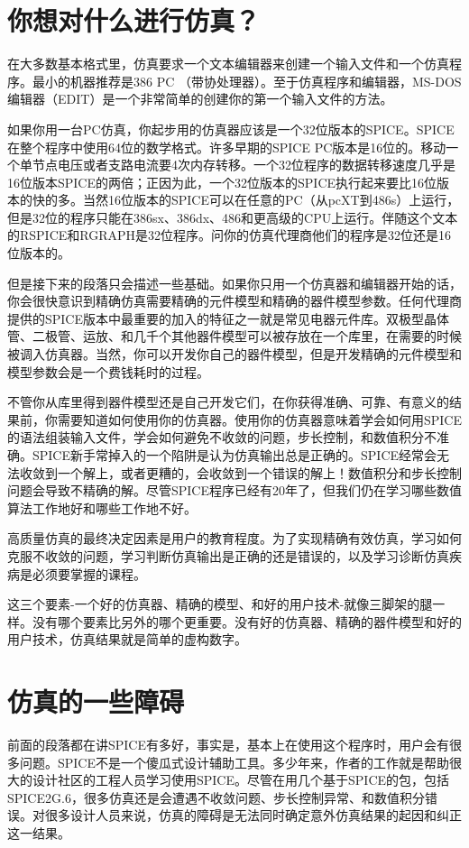 \section{你想对什么进行仿真？}
在大多数基本格式里，仿真要求一个文本编辑器来创建一个输入文件和一个仿真程序。最小的机器推荐是386 PC （带协处理器）。至于仿真程序和编辑器，MS-DOS编辑器（EDIT）是一个非常简单的创建你的第一个输入文件的方法。

如果你用一台PC仿真，你起步用的仿真器应该是一个32位版本的SPICE。SPICE在整个程序中使用64位的数学格式。许多早期的SPICE PC版本是16位的。移动一个单节点电压或者支路电流要4次内存转移。一个32位程序的数据转移速度几乎是16位版本SPICE的两倍；正因为此，一个32位版本的SPICE执行起来要比16位版本的快的多。当然16位版本的SPICE可以在任意的PC（从pcXT到486s）上运行，但是32位的程序只能在386sx、386dx、486和更高级的CPU上运行。伴随这个文本的RSPICE和RGRAPH是32位程序。问你的仿真代理商他们的程序是32位还是16位版本的。

但是接下来的段落只会描述一些基础。如果你只用一个仿真器和编辑器开始的话，你会很快意识到精确仿真需要精确的元件模型和精确的器件模型参数。任何代理商提供的SPICE版本中最重要的加入的特征之一就是常见电器元件库。双极型晶体管、二极管、运放、和几千个其他器件模型可以被存放在一个库里，在需要的时候被调入仿真器。当然，你可以开发你自己的器件模型，但是开发精确的元件模型和模型参数会是一个费钱耗时的过程。

不管你从库里得到器件模型还是自己开发它们，在你获得准确、可靠、有意义的结果前，你需要知道如何使用你的仿真器。使用你的仿真器意味着学会如何用SPICE的语法组装输入文件，学会如何避免不收敛的问题，步长控制，和数值积分不准确。SPICE新手常掉入的一个陷阱是认为仿真输出总是正确的。SPICE经常会无法收敛到一个解上，或者更糟的，会收敛到一个错误的解上！数值积分和步长控制问题会导致不精确的解。尽管SPICE程序已经有20年了，但我们仍在学习哪些数值算法工作地好和哪些工作地不好\cite{SPICE3}。

高质量仿真的最终决定因素是用户的教育程度。为了实现精确有效仿真，学习如何克服不收敛的问题，学习判断仿真输出是正确的还是错误的，以及学习诊断仿真疾病是必须要掌握的课程。

这三个要素-一个好的仿真器、精确的模型、和好的用户技术-就像三脚架的腿一样。没有哪个要素比另外的哪个更重要。没有好的仿真器、精确的器件模型和好的用户技术，仿真结果就是简单的虚构数字。

\section{仿真的一些障碍}
前面的段落都在讲SPICE有多好，事实是，基本上在使用这个程序时，用户会有很多问题。SPICE不是一个傻瓜式设计辅助工具。多少年来，作者的工作就是帮助很大的设计社区的工程人员学习使用SPICE。尽管在用几个基于SPICE的包，包括SPICE2G.6，很多仿真还是会遭遇不收敛问题、步长控制异常、和数值积分错误。对很多设计人员来说，仿真的障碍是无法同时确定意外仿真结果的起因和纠正这一结果。

